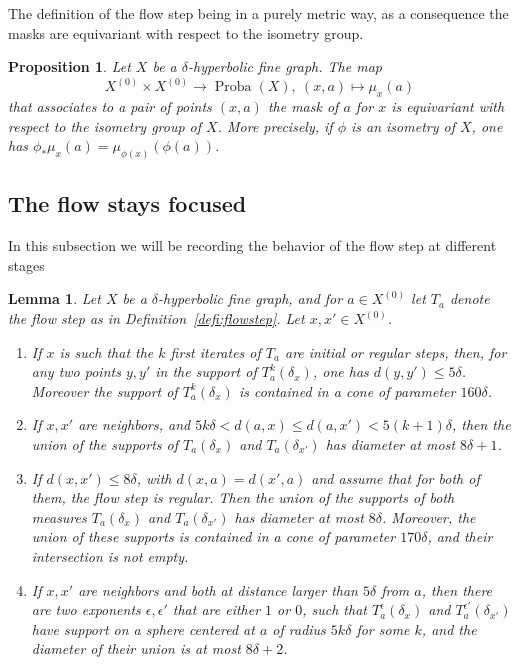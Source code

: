 \documentclass[11pt]{article}
\newtheorem{lemm}[theo]{Lemma}
\newtheorem{prop}[theo]{Proposition}
\theoremstyle{definition}
\numberwithin{equation}{section}
\DeclareMathOperator{\Proba}{Proba}
\begin{document}
The definition of the flow step being in a purely metric way, as a consequence the masks are equivariant with respect to the isometry group.

\begin{prop}\label{prop;mask_equivariance}
Let $X$ be a $\delta$-hyperbolic fine graph.
The map
\[
X^{(0)}\times X^{(0)}\to\Proba (X),\ (x,a)\mapsto \mu_{x}(a)
\]
that associates to a pair of points $(x,a)$ the mask of $a$ for $x$ is equivariant with respect to the isometry group of $X$. More precisely, if $\phi$ is an isometry of $X$, one has $\phi_*\mu_{x}(a) = \mu_{\phi (x)} (\phi(a))$.
\end{prop}

\subsection{The flow stays focused}

In this subsection we will be recording the behavior of the flow step at different stages

\begin{lemm}\label{focusLemma}
Let $X$ be a $\delta$-hyperbolic fine graph, and for $a\in X^{(0)}$ let $T_a$ denote the flow step as in Definition~\ref{defi:flowstep}. Let $x,x'\in X^{(0)}$.
\begin{enumerate}
\item \label{lem;stayfocus_regular}
If $x$ is such that the $k$ first iterates of $T_a$ are initial or regular steps, then, for any two points $y,y'$ in the support of $T^k_a(\delta_x)$, one has $d(y,y') \leq 5\delta$. Moreover the support of $T^k_a(\delta_x)$ is contained in a cone of parameter $160\delta$.
\item \label{lem;focus_initial}
If $x,x'$ are neighbors, and $5k\delta<d(a,x)\leq d(a,x') < 5(k+1)\delta$, then the union of the supports of $T_a(\delta_x)$ and $T_a(\delta_{x'})$ has diameter at most $8\delta+1$.
\item \label{lem;elementary_confluence}
If $d(x,x')\leq 8\delta$, with $d(x,a) = d(x',a)$ and assume that for both of them, the flow step is regular. Then the union of the supports of both measures $T_a(\delta_x)$ and $T_a(\delta_{x'})$ has diameter at most $8\delta$. Moreover, the union of these supports is contained in a cone of parameter $170 \delta$, and their intersection is not empty.

\item \label{prop;firststep}
If $x,x'$ are neighbors and both at distance larger than $5\delta$ from $a$, then there are two exponents $\epsilon,
\epsilon'$ that are either $1$ or $0$, such that $T^\epsilon_a(\delta_x)$ and $T^{\epsilon'}_a(\delta_{x'})$ have support on a sphere centered at $a$ of radius $5k\delta$ for some $k$, and the diameter of their union is at most $8\delta+2$.
\end{enumerate}
\end{lemm}
\end{document}
